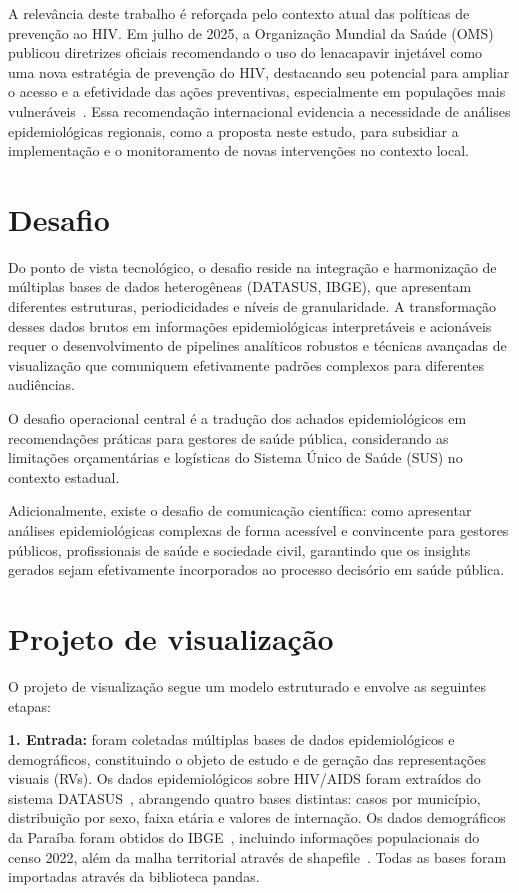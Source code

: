 \documentclass[10pt,a4paper]{article}
\begin{document}
\begin{multicols}{2}
A relevância deste trabalho é reforçada pelo contexto atual das políticas de prevenção ao HIV. Em julho de 2025, a Organização Mundial da Saúde (OMS) publicou diretrizes oficiais recomendando o uso do lenacapavir injetável como uma nova estratégia de prevenção do HIV, destacando seu potencial para ampliar o acesso e a efetividade das ações preventivas, especialmente em populações mais vulneráveis~\cite{oms_lenacapavir_2025}. Essa recomendação internacional evidencia a necessidade de análises epidemiológicas regionais, como a proposta neste estudo, para subsidiar a implementação e o monitoramento de novas intervenções no contexto local.

\section{Desafio}

Do ponto de vista tecnológico, o desafio reside na integração e harmonização de múltiplas bases de dados heterogêneas (DATASUS, IBGE), que apresentam diferentes estruturas, periodicidades e níveis de granularidade. A transformação desses dados brutos em informações epidemiológicas interpretáveis e acionáveis requer o desenvolvimento de pipelines analíticos robustos e técnicas avançadas de visualização que comuniquem efetivamente padrões complexos para diferentes audiências.

O desafio operacional central é a tradução dos achados epidemiológicos em recomendações práticas para gestores de saúde pública, considerando as limitações orçamentárias e logísticas do Sistema Único de Saúde (SUS) no contexto estadual.

Adicionalmente, existe o desafio de comunicação científica: como apresentar análises epidemiológicas complexas de forma acessível e convincente para gestores públicos, profissionais de saúde e sociedade civil, garantindo que os insights gerados sejam efetivamente incorporados ao processo decisório em saúde pública.

\section{Projeto de visualização}

O projeto de visualização segue um modelo estruturado e envolve as seguintes etapas:

\textbf{1. Entrada:} foram coletadas múltiplas bases de dados epidemiológicos e demográficos, constituindo o objeto de estudo e de geração das representações visuais (RVs). Os dados epidemiológicos sobre HIV/AIDS foram extraídos do sistema DATASUS~\cite{datasus_tabnet}, abrangendo quatro bases distintas: casos por município, distribuição por sexo, faixa etária e valores de internação. Os dados demográficos da Paraíba foram obtidos do IBGE~\cite{ibge_paraiba}, incluindo informações populacionais do censo 2022, além da malha territorial através de shapefile~\cite{ibge_malhas}. Todas as bases foram importadas através da biblioteca pandas.


\end{multicols}
\end{document}

